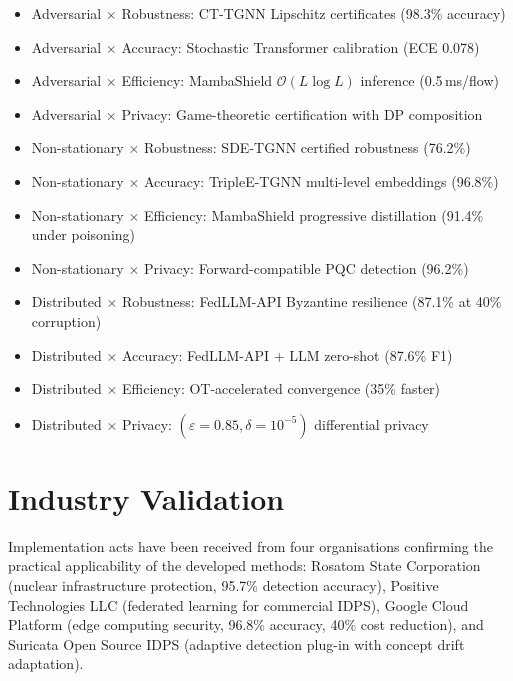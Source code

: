 \begin{itemize}
\item Adversarial $\times$ Robustness: CT-TGNN Lipschitz certificates (98.3\% accuracy)
\item Adversarial $\times$ Accuracy: Stochastic Transformer calibration (ECE 0.078)
\item Adversarial $\times$ Efficiency: MambaShield $\mathcal{O}(L\log L)$ inference (0.5\,ms/flow)
\item Adversarial $\times$ Privacy: Game-theoretic certification with DP composition
\item Non-stationary $\times$ Robustness: SDE-TGNN certified robustness (76.2\%)
\item Non-stationary $\times$ Accuracy: TripleE-TGNN multi-level embeddings (96.8\%)
\item Non-stationary $\times$ Efficiency: MambaShield progressive distillation (91.4\% under poisoning)
\item Non-stationary $\times$ Privacy: Forward-compatible PQC detection (96.2\%)
\item Distributed $\times$ Robustness: FedLLM-API Byzantine resilience (87.1\% at 40\% corruption)
\item Distributed $\times$ Accuracy: FedLLM-API + LLM zero-shot (87.6\% F1)
\item Distributed $\times$ Efficiency: OT-accelerated convergence (35\% faster)
\item Distributed $\times$ Privacy: $(\varepsilon{=}0.85,\delta{=}10^{-5})$ differential privacy
\end{itemize}


\section*{Industry Validation}

Implementation acts have been received from four organisations confirming the practical applicability of the developed methods: Rosatom State Corporation (nuclear infrastructure protection, 95.7\% detection accuracy), Positive Technologies LLC (federated learning for commercial IDPS), Google Cloud Platform (edge computing security, 96.8\% accuracy, 40\% cost reduction), and Suricata Open Source IDPS (adaptive detection plug-in with concept drift adaptation).


